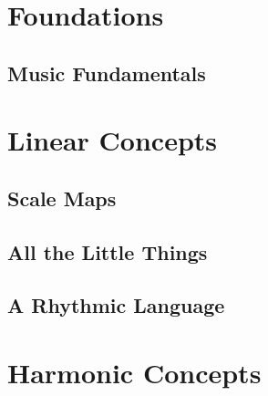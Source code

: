 \documentclass[twoside]{book}
\begin{document}
\frontmatter







\tableofcontents
\clearpage

\listofmusicalexamples
\clearpage





\mainmatter

\part{Foundations}

\chapter{Music Fundamentals}


\part{Linear Concepts}

\chapter{Scale Maps}


\chapter{All the Little Things}


\chapter{A Rhythmic Language}


\part{Harmonic Concepts}
\end{document}
